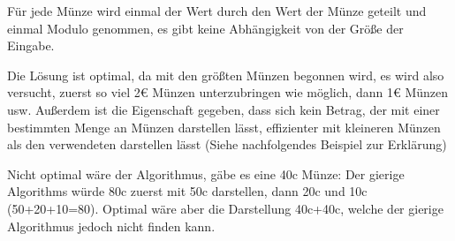 \documentclass[
    10pt,
    parskip=half-,
    paper=a4,
    english,ngerman,
]{scrartcl}
\begin{document}
Für jede Münze wird einmal der Wert durch den Wert der Münze geteilt und
einmal Modulo genommen, es gibt keine Abhängigkeit von der Größe der Eingabe.

Die Lösung ist optimal, da mit den größten Münzen begonnen wird, es wird
also versucht, zuerst so viel 2\euro{} Münzen unterzubringen wie möglich,
dann 1\euro{} Münzen usw. Außerdem ist die Eigenschaft gegeben, dass sich
kein Betrag, der mit einer bestimmten Menge an Münzen darstellen lässt, effizienter mit kleineren Münzen als den verwendeten darstellen lässt (Siehe nachfolgendes Beispiel zur Erklärung)

Nicht optimal wäre der Algorithmus, gäbe es eine 40c Münze: Der gierige Algorithms würde 80c zuerst mit 50c darstellen, dann 20c und 10c (50+20+10=80). Optimal wäre aber die Darstellung 40c+40c, welche der gierige Algorithmus jedoch nicht finden kann.

\end{document}

